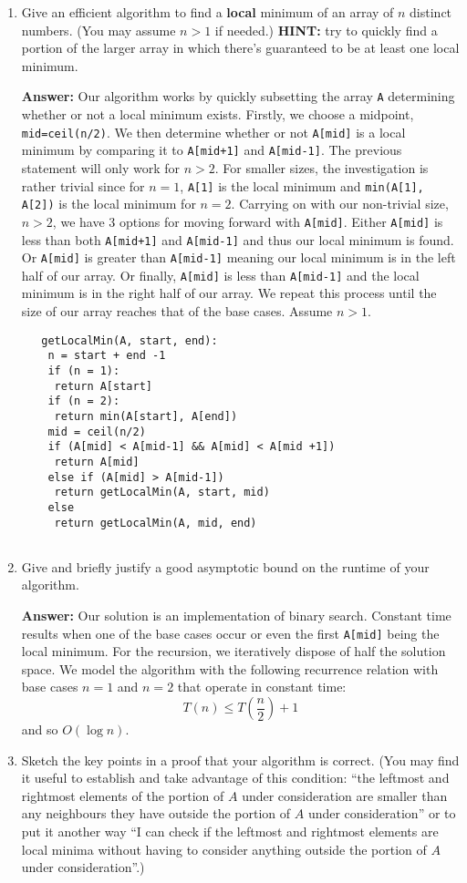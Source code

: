 \documentclass[11pt, oneside]{article}   	%
\theoremstyle{definition}
\theoremstyle{remark}
\begin{document}
\begin{enumerate}
\item Give an efficient algorithm to find a \textbf{local} minimum of an array
   of $n$ distinct numbers. (You may assume $n > 1$ if
   needed.) \textbf{HINT:} try to quickly find a portion of the larger array
   in which there's guaranteed to be at least one local minimum.
   
   \textbf{Answer: }Our algorithm works by quickly subsetting the array \texttt{A} determining whether or not a local minimum exists. Firstly, we choose a midpoint, \texttt{mid=ceil(n/2)}. We then determine whether or not \texttt{A[mid]} is a local minimum by comparing it to \texttt{A[mid+1]} and \texttt{A[mid-1]}. The previous statement will only work for $n > 2$. For smaller sizes, the investigation is rather trivial since for $n=1$, \texttt{A[1]} is the local minimum and \texttt{min(A[1], A[2])}  is the local minimum for $n=2$. Carrying on with our non-trivial size, $n > 2$, we have 3 options for moving forward with \texttt{A[mid]}. Either \texttt{A[mid]} is less than both \texttt{A[mid+1]} and \texttt{A[mid-1]} and thus our local minimum is found. Or \texttt{A[mid]} is greater than \texttt{A[mid-1]} meaning our local minimum is in the left half of our array. Or finally, \texttt{A[mid]} is  less than \texttt{A[mid-1]} and the local minimum is in the right half of our array. We repeat this process until the size of our array reaches that of the base cases. Assume $n>1$.
   \begin{verbatim}
   getLocalMin(A, start, end):
    n = start + end -1
    if (n = 1):
     return A[start]
    if (n = 2):
     return min(A[start], A[end])
    mid = ceil(n/2)
    if (A[mid] < A[mid-1] && A[mid] < A[mid +1])
     return A[mid]
    else if (A[mid] > A[mid-1]) 
     return getLocalMin(A, start, mid)
    else
     return getLocalMin(A, mid, end)
    
	\end{verbatim}    
\item Give and briefly justify a good asymptotic bound on the runtime of
   your algorithm. 
   
   \textbf{Answer: }Our solution is an implementation of binary search. Constant time results when one of the base cases occur or even the first \texttt{A[mid]} being the local minimum. For the recursion, we iteratively dispose of half the solution space. We model the algorithm with the following recurrence relation with base cases $n=1$ and $n=2$ that operate in constant time: $$T(n) \leq T(\frac{n}{2}) + 1$$ and so $O(\log n)$.
\item Sketch the key points in a proof that your algorithm is
   correct. (You may find it useful to establish and take advantage of
   this condition: ``the leftmost and rightmost elements of the portion
   of $A$ under consideration are smaller than any neighbours they
   have outside the portion of $A$ under consideration'' or to put it
   another way ``I can check if the leftmost and rightmost elements are
   local minima without having to consider anything outside the
   portion of $A$ under consideration''.)
   

\end{enumerate}
\end{document}
